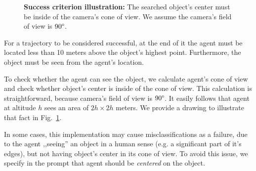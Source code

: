 \begin{figure}[h]
\begin{center}
\end{center}
    \caption{\textbf{Success criterion illustration:} The searched object's center must be inside of the camera's cone of view. We assume the camera's field of view is $90\degree$.}
    \label{fig:metricdraw}
\end{figure}

For a trajectory to be considered successful, at the end of it the agent must be located less than 10 meters above the object's highest point. Furthermore, the object must be seen from the agent's location.

To check whether the agent can see the object, we calculate agent's cone of view and check whether object's center is inside of the cone of view. This calculation is straightforward, because camera's field of view is \(90\degree\). It easily follows that agent at altitude \(h\) sees an area of \(2h \times 2h\) meters. We provide a drawing to illustrate that fact in Fig.~\ref{fig:metricdraw}.

In some cases, this implementation may cause misclassifications as a failure, due to the agent ,,seeing'' an object in a human sense (e.g. a significant part of it's edges), but not having object's center in its cone of view. To avoid this issue, we specify in the prompt that agent should be \textit{centered} on the object.

